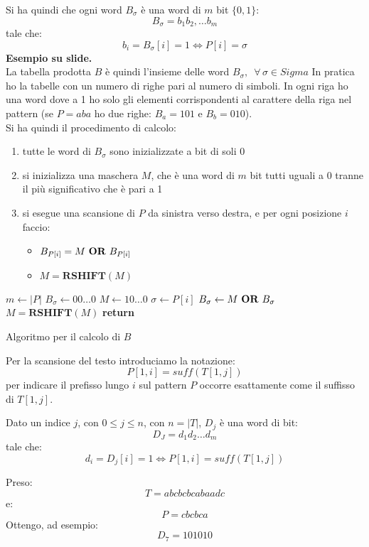 Si ha quindi che ogni word $B_\sigma$ è una word di $m$ bit $\{0,1\}$:
\[B_\sigma=b_1b_2,\ldots b_m\]
tale che:
\[b_i=B_\sigma[i]=1\iff P[i]=\sigma\]
\textbf{Esempio su slide.}\\
La tabella prodotta $B$ è quindi l'insieme delle word
$B_\sigma,\,\,\,\forall\,\sigma\in Sigma$
In pratica ho la tabelle con un numero di righe pari al numero di simboli. In
ogni riga ho una word dove a 1 ho solo gli elementi corrispondenti al carattere
della riga nel pattern (se $P=aba$ ho due righe: $B_a=101$ e $B_b=010$).\\
Si ha quindi il procedimento di calcolo:
\begin{enumerate}
  \item tutte le word di $B_\sigma$ sono inizializzate a bit di soli 0
  \item si inizializza una maschera $M$, che è una word di $m$ bit tutti uguali
  a 0 tranne il più significativo che è pari a 1
  \item si esegue una scansione di $P$ da sinistra verso destra, e per ogni
  posizione $i$ faccio:
  \begin{itemize}
    \item $B_{P[i]}=M\mbox{ \textbf{OR} }B_{P[i]}$
    \item $M=\mathbf{RSHIFT}(M)$
  \end{itemize}
\end{enumerate}
\begin{algorithm}
  \begin{algorithmic}
    \State $m\gets |P|$
    \State $B_\sigma \gets 00\ldots0$
    \EndFor
    \State $M \gets 10\ldots0$
    \State $\sigma \gets P[i]$
    \State $B_\sigma \gets M\mbox{ \textbf{OR} }B_\sigma$
    \State $M=\mathbf{RSHIFT}(M)$
    \EndFor
    \State \textbf{return}
    \EndFunction
  \end{algorithmic}
  \caption{Algoritmo per il calcolo di $B$}
\end{algorithm}
Per la scansione del testo introduciamo la notazione:
\[P[1,i]=suff(T[1,j])\]
per indicare il prefisso lungo $i$ sul pattern $P$ occorre esattamente come il
suffisso di $T[1,j]$.
\begin{definizione}
  Dato un indice $j$, con $0\leq j\leq n$, con $n=|T|$, $D_j$ è una word di bit:
  \[D_J=d_1d_2\ldots d_m\]
  tale che:
  \[d_i=D_j[i]=1\iff P[1,i]=suff(T[1,j])\]
\end{definizione}
\begin{esempio}
  Preso:
  \[T=abcbcbcabaadc\]
  e:
  \[P=cbcbca\]
  Ottengo, ad esempio:
  \[D_7=101010\]
\end{esempio}
